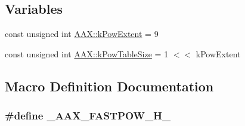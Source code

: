 \subsection*{Variables}
\begin{DoxyCompactItemize}
\item 
const unsigned int \hyperlink{a00288_a4e6fcac015bb083018e8897563966cf6}{A\+A\+X\+::k\+Pow\+Extent} = 9
\item 
const unsigned int \hyperlink{a00288_a59f1ab59ea51ed94f87e8d935870df9e}{A\+A\+X\+::k\+Pow\+Table\+Size} = 1 $<$$<$ k\+Pow\+Extent
\end{DoxyCompactItemize}


\subsection{Macro Definition Documentation}
\hypertarget{a00212_ac6d8a45526d6683f24769be9e942fc4e}{}
\subsubsection[{\+\_\+\+A\+A\+X\+\_\+\+F\+A\+S\+T\+P\+O\+W\+\_\+\+H\+\_\+}]{\setlength{\rightskip}{0pt plus 5cm}\#define \+\_\+\+A\+A\+X\+\_\+\+F\+A\+S\+T\+P\+O\+W\+\_\+\+H\+\_\+}\label{a00212_ac6d8a45526d6683f24769be9e942fc4e}
